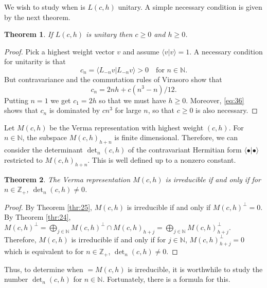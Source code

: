 \documentclass[a4paper, 12pt, reqno]{amsart}
\newtheorem{theorem}{Theorem}[subsection]
\theoremstyle{remark}
\numberwithin{equation}{subsection}
\begin{document}
We wish to study when is $L(c,h)$ unitary.
A simple necessary condition is given by the next theorem.

\begin{theorem}
  \label{thr:26}
  If $L(c, h)$ is unitary then $c \ge 0$ and $h \ge 0$.
\end{theorem}

\begin{proof}
  Pick a highest weight vector $v$ and assume $\langle v| v\rangle=1$.
  A necessary condition for unitarity is that
  \begin{equation*}
    c_n = \langle L_{-n}v| L_{-n}v\rangle > 0 \quad \text{for } n \in \mathbb{N}.
  \end{equation*}
  But contravariance and the commutation rules of Virasoro show that
  \begin{equation}
    \label{eq:36}
    c_n = 2nh + c(n^3 - n)/12.
  \end{equation}
  Putting $n = 1$ we get $c_1 = 2h$ so that we must have $h \ge 0$.
  Moreover, \eqref{eq:36} shows that $c_n$ is dominated by $cn^3$ for large $n$, so that $c \ge 0$ is also necessary.
\end{proof}

Let $M(c, h)$ be the Verma representation with highest weight $(c, h)$.
For $n \in \mathbb{N}$, the subspace $M(c, h)_{h + n}$ is finite dimensional.
Therefore, we can consider the determinant $\det_n(c, h)$ of the contravariant Hermitian form $\langle \bullet| \bullet\rangle$ restricted to $M(c, h)_{h + n}$.
This is well defined up to a nonzero constant.

\begin{theorem}
  \label{thr:27}
  The Verma representation $M(c, h)$ is irreducible if and only if for $n \in \mathbb{Z}_+$, $\det_n(c, h) \neq 0$.
\end{theorem}

\begin{proof}
  By Theorem \ref{thr:25}, $M(c, h)$ is irreducible if and only if $M(c, h)^{\perp} = 0$.
  By Theorem \ref{thr:24}, $M(c, h)^{\perp} = \bigoplus_{j \in \mathbb{N}}M(c, h)^{\perp} \cap M(c, h)_{h + j} = \bigoplus_{j \in \mathbb{N}}M(c, h)_{h + j}^{\perp}$.
  Therefore, $M(c, h)$ is irreducible if and only if for $j \in \mathbb{N}$, $M(c, h)_{h + j}^{\perp} = 0$ which is equivalent to for $n \in \mathbb{Z}_+$, $\det_n(c, h) \neq 0$.
\end{proof}

Thus, to determine when $=M(c, h)$ is irreducible, it is worthwhile to study the number $\det_n(c, h)$ for $n \in \mathbb{N}$.
Fortunately, there is a formula for this.
\end{document}
